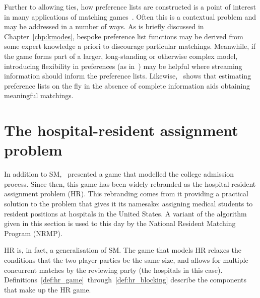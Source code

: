 Further to allowing ties, how preference lists are constructed is a point of
interest in many applications of matching games~\cite{Iwama2008,Manlove2002}.
Often this is a contextual problem and may be addressed in a number of ways. As
is briefly discussed in Chapter~\ref{chp:kmodes}, bespoke preference list
functions may be derived from some expert knowledge a priori to discourage
particular matchings. Meanwhile, if the game forms part of a larger,
long-standing or otherwise complex model, introducing flexibility in
preferences (as in~\cite{Agarwal2017,Menzel2015}) may be helpful where streaming
information should inform the preference lists. Likewise,~\cite{Rastegari2016}
shows that estimating preference lists on the fly in the absence of complete
information aids obtaining meaningful matchings.


\section{The hospital-resident assignment problem}

In addition to SM,~\cite{Gale1962} presented a game that modelled the college
admission process. Since then, this game has been widely rebranded as the
hospital-resident assignment problem (HR). This rebranding comes from it
providing a practical solution to the problem that gives it its namesake:
assigning medical students to resident positions at hospitals in the United
States. A variant of the algorithm given in this section is used to this day by
the National Resident Matching Program (NRMP).

HR is, in fact, a generalisation of SM. The game that models HR relaxes the
conditions that the two player parties be the same size, and allows for multiple
concurrent matches by the reviewing party (the hospitals in this case).
Definitions~\ref{def:hr_game}~through~\ref{def:hr_blocking} describe the
components that make up the HR game.

